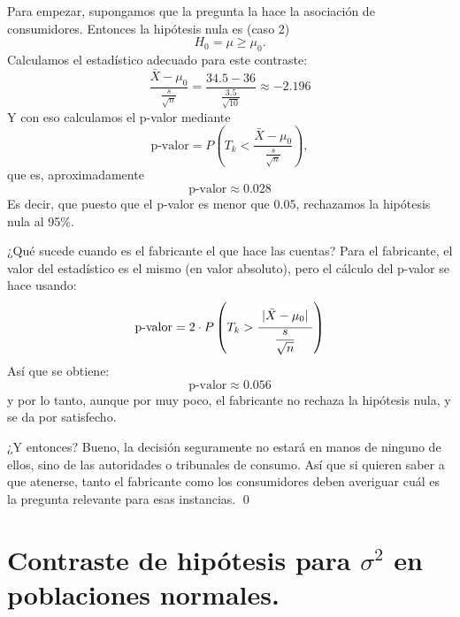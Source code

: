 \begin{ejemplo}
Para empezar, supongamos que la pregunta la hace la asociación de consumidores. Entonces la hipótesis nula es (caso 2)
    \[H_0={\mu\geq \mu_0}.\]
Calculamos el estadístico adecuado para este contraste:
     \[\dfrac{\bar X-\mu_0}{\frac{s}{\sqrt{n}}}=\dfrac{34.5-36}{\frac{3.5}{\sqrt{10}}}\approx -2.196\]
Y con eso calculamos el p-valor mediante
\[\mbox{p-valor}=
            P\left(T_k < \dfrac{\bar X-\mu_0}{\frac{s}{\sqrt{n}}}\right),\]
que es, aproximadamente
\[\mbox{p-valor}\approx 0.028\]
Es decir, que puesto que el p-valor es menor que $0.05$, rechazamos la hipótesis nula al 95\%.

¿Qué sucede cuando es el fabricante el que hace las cuentas? Para el fabricante, el valor del estadístico es el mismo (en valor absoluto), pero el cálculo del p-valor se hace usando:
\[        \mbox{p-valor}= 2\cdot P\left(T_k > \dfrac{ \colorbox{white}{$|\bar X-\mu_0|$}}{\dfrac{s}{\sqrt{n}}}\right)
\]
Así que se obtiene:
\[\mbox{p-valor}\approx 0.056\]
y por lo tanto, aunque por muy poco, el fabricante no rechaza la hipótesis nula, y se da por satisfecho.

¿Y entonces? Bueno, la decisión seguramente no estará en manos de ninguno de ellos, sino de las autoridades o tribunales de consumo. Así que si quieren saber a que atenerse, tanto el fabricante como los consumidores deben averiguar cuál es la pregunta relevante para esas instancias.
\qed
\end{ejemplo}


\section{Contraste de hipótesis para $\sigma^2$ en poblaciones normales.}
\label{cap07:sec:contrasteHipotesisSigma2}

